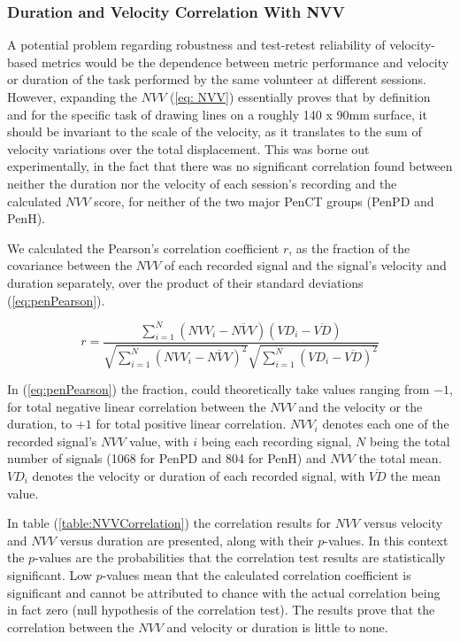 \subsubsection{Duration and Velocity Correlation With NVV}
\label{subsubsec:PenCTDurVelCorTesting}
A potential problem regarding robustness and test-retest reliability of velocity-based metrics would be the dependence between metric performance and velocity or duration of the task performed by the same volunteer at different sessions. However, expanding the $NVV$ (\ref{eq: NVV}) essentially proves that by definition and for the specific task of drawing lines on a roughly 140 x 90mm surface, it should be invariant to the scale of the velocity, as it translates to the sum of velocity variations over the total displacement. This was borne out experimentally, in the fact that there was no significant correlation found between neither the duration nor the velocity of each session's recording and the calculated $NVV$ score, for neither of the two major \gls{PenCT} groups (\gls{PenPD} and \gls{PenH}). 

We calculated the Pearson's correlation coefficient $r$, as the fraction of the covariance between the $NVV$ of each recorded signal and the signal's velocity and duration separately, over the product of their standard deviations (\ref{eq:penPearson}). 

\begin{equation} \label{eq:penPearson}
r = \frac{ \sum_{i=1}^{N} (NVV_{i} - \overline{NVV})(VD_{i} - \overline{VD}) } 
		 { \sqrt{\sum_{i=1}^{N} (NVV_{i} - \overline{NVV})^{2}} \sqrt{\sum_{i=1}^{N} (VD_{i} - \overline{VD})^{2}} }
\end{equation}

\noindent
In (\ref{eq:penPearson}) the fraction, could theoretically take values ranging from $-1$, for total negative linear correlation between the $NVV$ and the velocity or the duration, to $+1$ for total positive linear correlation. $NVV_{i}$ denotes each one of the recorded signal's $NVV$ value, with $i$ being each recording signal, $N$ being the total number of signals (1068 for \gls{PenPD} and 804 for \gls{PenH}) and $\overline{NVV}$ the total mean. $VD_{i}$ denotes the velocity or duration of each recorded signal, with $\overline{VD}$ the mean value. 

In table (\ref{table:NVVCorrelation}) the correlation results for $NVV$ versus velocity and $NVV$ versus duration are presented, along with their $p$-values. In this context the $p$-values are the probabilities that the correlation test results are statistically significant. Low $p$-values mean that the calculated correlation coefficient is significant and cannot be attributed to chance with the actual correlation being in fact zero (null hypothesis of the correlation test). The results prove that the correlation between the $NVV$ and velocity or duration is little to none. 

